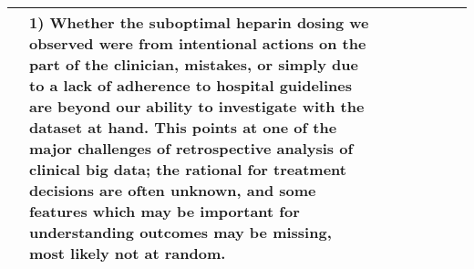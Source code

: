 \begin{table}[!th]
\begin{tabular}{|p{3 em}|p{3 em}|p{3 em}|p{3em}|p{6em}|p{9em}|p{6 em}|p{6em}|}
& 
\textbf{1)} Whether the suboptimal heparin dosing we observed were from intentional actions on the part of the clinician, mistakes, or simply due to a lack of adherence to hospital guidelines are beyond our ability to investigate with the dataset at hand. This points at one of the major challenges of retrospective analysis of clinical big data; the rational for
treatment decisions are often unknown, and some features
which may be important for understanding outcomes may
be missing, most likely not at random.
   \\\midrule
\end{tabular}
\vspace*{-2em}
\end{table}   

